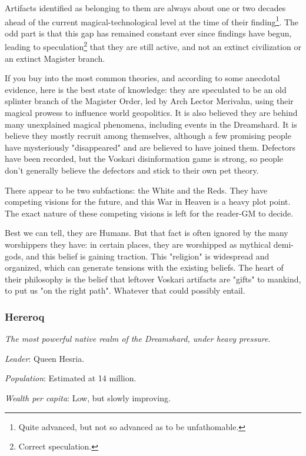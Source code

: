 Artifacts identified as belonging to them are always about one or two decades ahead of the current magical-technological level at the time of their finding\footnote{Quite advanced, but not so advanced as to be unfathomable.}. The odd part is that this gap has remained constant ever since findings have begun, leading to speculation\footnote{Correct speculation.} that they are still active, and not an extinct civilization or an extinct Magister branch.

If you buy into the most common theories, and according to some anecdotal evidence, here is the best state of knowledge: they are speculated to be an old splinter branch of the Magister Order, led by Arch Lector Merivahn, using their magical prowess to influence world geopolitics. It is also believed they are behind many unexplained magical phenomena, including events in the Dreamshard. It is believe they mostly recruit among themselves, although a few promising people have mysteriously "disappeared" and are believed to have joined them. Defectors have been recorded, but the Voskari disinformation game is strong, so people don't generally believe the defectors and stick to their own pet theory.

There appear to be two subfactions: the White and the Reds. They have competing visions for the future, and this War in Heaven is a heavy plot point. The exact nature of these competing visions is left for the reader-GM to decide.

Best we can tell, they are Humans. But that fact is often ignored by the many worshippers they have: in certain places, they are worshipped as mythical demi-gods, and this belief is gaining traction. This "religion" is widespread and organized, which can generate tensions with the existing beliefs. The heart of their philosophy is the belief that leftover Voskari artifacts are "gifts" to mankind, to put us "on the right path". Whatever that could possibly entail.


\subsubsection{Hereroq}

\textit{The most powerful native realm of the Dreamshard, under heavy pressure.}

\textit{Leader}: Queen Hesria.

\textit{Population}: Estimated at 14 million.

\textit{Wealth per capita}: Low, but slowly improving.

